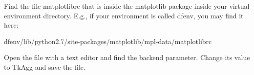 Find the file {\ttfamily matplotlibrc} that is inside the {\ttfamily matplotlib} package inside your virtual environment directory. E.\+g., if your environment is called {\ttfamily dfenv}, you may find it here\+: \begin{DoxyVerb}dfenv/lib/python2.7/site-packages/matplotlib/mpl-data/matplotlibrc
\end{DoxyVerb}


Open the file with a text editor and find the {\ttfamily backend} parameter. Change its value to {\ttfamily Tk\+Agg} and save the file. 